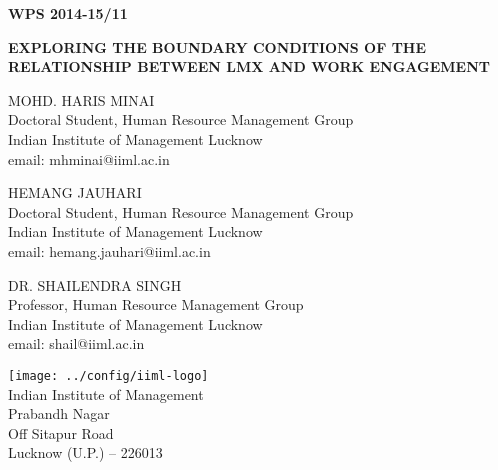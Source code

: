 \thispagestyle{empty}

\hfill\textbf{WPS 2014-15/11}

\vfill

\begin{center}
    \textbf{EXPLORING THE BOUNDARY CONDITIONS OF THE RELATIONSHIP BETWEEN LMX AND WORK ENGAGEMENT}
\end{center}

\vfill

\begin{center}

    MOHD. HARIS MINAI\\
    Doctoral Student, Human Resource Management Group\\
    Indian Institute of Management Lucknow\\
    email: mhminai@iiml.ac.in\\

    \vspace{1\baselineskip}

    HEMANG JAUHARI\\
    Doctoral Student, Human Resource Management Group\\
    Indian Institute of Management Lucknow\\
    email: hemang.jauhari@iiml.ac.in\\

    \vspace{1\baselineskip}

    DR. SHAILENDRA SINGH\\
    Professor, Human Resource Management Group\\
    Indian Institute of Management Lucknow\\
    email: shail@iiml.ac.in\\

    \vspace{1cm}

\end{center}

\vfill

\begin{center}
    \texttt{[image: ../config/iiml-logo]}\\
    Indian Institute of Management\\
    Prabandh Nagar\\
    Off Sitapur Road\\
    Lucknow (U.P.)  -- 226013\\
\end{center}

